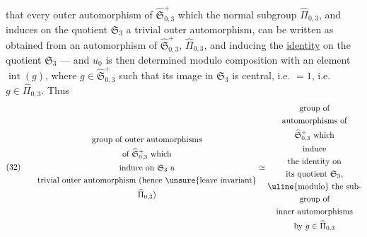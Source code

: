   that every outer automorphism  of $\widehat{\mathfrak S}_{0,3}^{+}$ which  the normal subgroup $\widehat\Pi_{0,3}$, and induces on the quotient $\mathfrak S_{3}$ a trivial outer automorphism, can be written as obtained from an automorphism  of $\widehat{\mathfrak S}_{0,3}^{+}$,  $\widehat\Pi_{0,3}$, and inducing the \uline{identity} on the quotient $\mathfrak S_{3}$ --- and $u_0$ is then determined modulo composition with an element $\operatorname{int}(g)$, where $g\in\widehat{\mathfrak S}_{0,3}^{+}$  such that its image in $\mathfrak S_{3}$ is central, i.e. $=1$, i.e. $g\in\widehat\Pi_{0,3}$. Thus
\[
(32)\qquad
\begin{gathered}
\text{group of outer automorphisms}\\
\text{of $\widehat{\mathfrak S}_{0,3}^{+}$ which}\\
\text{induce on $\mathfrak S_{3}$ a}\\
\text{trivial outer automorphism (hence \unsure{leave invariant}}\\
\widehat\Pi_{0,3})
\end{gathered}
\simeq
\begin{gathered}
\text{group of}\\
\text{automorphisms of}\\
\widehat{\mathfrak S}_{0,3}^{+}\text{ which}\\
\text{induce}\\
\text{the identity on}\\
\text{its quotient $\mathfrak S_{3}$,}\\
\text{\uline{modulo} the sub-}\\
\text{group of}\\
\text{inner automorphisms}\\
\text{by $g\in\widehat\Pi_{0,3}$}
\end{gathered}
\]